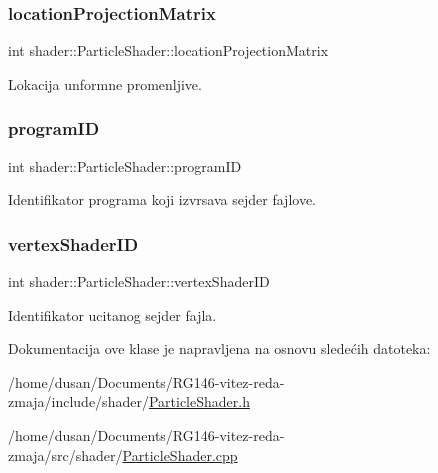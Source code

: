 \subsubsection{\texorpdfstring{location\+Projection\+Matrix}{locationProjectionMatrix}}
{\footnotesize\ttfamily int shader\+::\+Particle\+Shader\+::location\+Projection\+Matrix\hspace{0.3cm}{\ttfamily [private]}}



Lokacija unformne promenljive. 

\mbox{\label{classshader_1_1ParticleShader_a885fd3acfd60fc4567406bb9f2c6e19c}} 
\subsubsection{\texorpdfstring{program\+ID}{programID}}
{\footnotesize\ttfamily int shader\+::\+Particle\+Shader\+::program\+ID\hspace{0.3cm}{\ttfamily [private]}}



Identifikator programa koji izvrsava sejder fajlove. 

\mbox{\label{classshader_1_1ParticleShader_a7d53e05df70426b6d6c46fa29685be6d}} 
\subsubsection{\texorpdfstring{vertex\+Shader\+ID}{vertexShaderID}}
{\footnotesize\ttfamily int shader\+::\+Particle\+Shader\+::vertex\+Shader\+ID\hspace{0.3cm}{\ttfamily [private]}}



Identifikator ucitanog sejder fajla. 



Dokumentacija ove klase je napravljena na osnovu sledećih datoteka\+:\begin{DoxyCompactItemize}
\item 
/home/dusan/\+Documents/\+R\+G146-\/vitez-\/reda-\/zmaja/include/shader/\hyperlink{ParticleShader_8h}{Particle\+Shader.\+h}\item 
/home/dusan/\+Documents/\+R\+G146-\/vitez-\/reda-\/zmaja/src/shader/\hyperlink{ParticleShader_8cpp}{Particle\+Shader.\+cpp}\end{DoxyCompactItemize}
